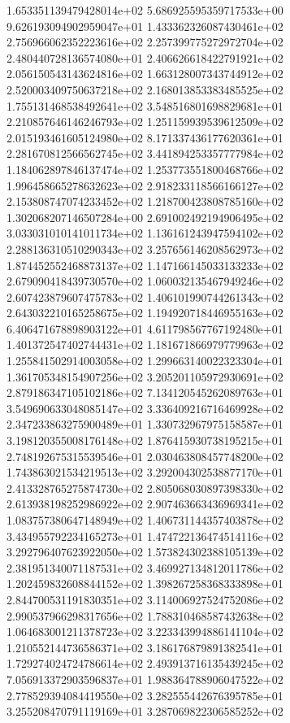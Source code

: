 1.653351139479428014e+02 5.686925595359717533e+00 9.626193094902959047e+01
1.433362326087430461e+02 2.756966062352223616e+02 2.257399775272972704e+02
2.480440728136574080e+01 2.406626618422791921e+02 2.056150543143624816e+02
1.663128007343744912e+02 2.520003409750637218e+02 2.168013853383485525e+02
1.755131468538492641e+02 3.548516801698829681e+01 2.210857646146246793e+02
1.251159939539612509e+02 2.015193461605124980e+02 8.171337436177620361e+01
2.281670812566562745e+02 3.441894253357777984e+02 1.184062897846137474e+02
1.253773551800468766e+02 1.996458665278632623e+02 2.918233118566166127e+02
2.153808747074233452e+02 1.218700423808785160e+02 1.302068207146507284e+00
2.691002492194906495e+02 3.033031010141011734e+02 1.136161243947594102e+02
2.288136310510290343e+02 3.257656146208562973e+02 1.874452552468873137e+02
1.147166145033133233e+02 2.679090418439730570e+02 1.060032135467949246e+02
2.607423879607475783e+02 1.406101990744261343e+02 2.643032210165258675e+02
1.194920718446955163e+02 6.406471678898903122e+01 4.611798567767192480e+01
1.401372547402744431e+02 1.181671866979779963e+02 1.255841502914003058e+02
1.299663140022323304e+01 1.361705348154907256e+02 3.205201105972930691e+02
2.879186347105102186e+02 7.134120545262089763e+01 3.549690633048085147e+02
3.336409216716469928e+02 2.347233863275900489e+01 1.330732967975158587e+01
3.198120355008176148e+02 1.876415930738195215e+01 2.748192675315539546e+01
2.030463808457748200e+02 1.743863021534219513e+02 3.292004302538877170e+01
2.413328765275874730e+02 2.805068030897398330e+02 2.613938198252986922e+02
2.907463663436969341e+02 1.083757380647148949e+02 1.406731144357403878e+02
3.434955792234165273e+01 1.474722136474514116e+02 3.292796407623922050e+02
1.573824302388105139e+02 2.381951340071187531e+02 3.469927134812011786e+02
1.202459832608844152e+02 1.398267258368333898e+01 2.844700531191830351e+02
3.114006927524752086e+02 2.990537966298317656e+02 1.788310468587432638e+02
1.064683001211378723e+02 3.223343994886141104e+02 1.210552144736586371e+02
3.186176879891382541e+01 1.729274024724786614e+02 2.493913716135439245e+02
7.056913372903596837e+01 1.988364788906047522e+02 2.778529394084419550e+02
3.282555442676395785e+01 3.255208470791119169e+01 3.287069822306585252e+02

